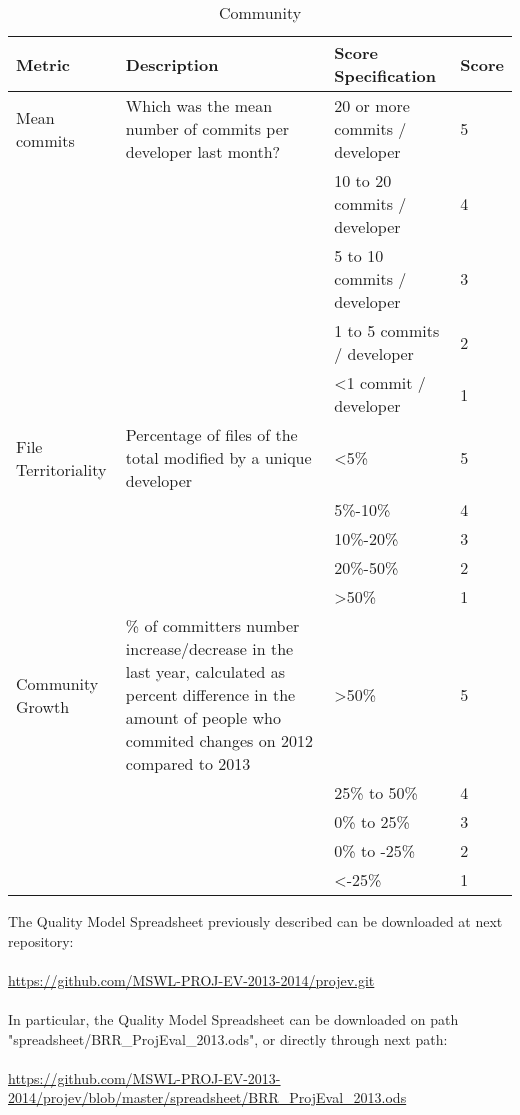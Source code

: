 \documentclass[11pt]{article}
\begin{document}
\begin{table}[H]
  \begin{center}
    \begin{tabular}{ | p{3cm} | p{5cm} | p{3cm} | l | }
    \hline
    Metric & Description & Score Specification & Score \\
    \hline
    Mean commits & Which was the mean number of commits per developer last month? & 20 or more commits / developer & 5 \\ \cline{3-3} \cline{4-4}
    & & 10 to 20 commits / developer & 4 \\ \cline{3-3}\cline{4-4}
    & & 5 to 10 commits / developer & 3 \\ \cline{3-3}\cline{4-4}
    & & 1 to 5 commits / developer & 2 \\ \cline{3-3}\cline{4-4}
    & & \textless 1 commit / developer & 1 \\ 
    \hline
    File Territoriality & Percentage of files of the total modified by a unique developer & \textless 5\% & 5 \\ \cline{3-3} \cline{4-4}
    & & 5\%-10\%  & 4 \\ \cline{3-3}\cline{4-4}
    & & 10\%-20\% & 3 \\ \cline{3-3}\cline{4-4}
    & & 20\%-50\% & 2 \\ \cline{3-3}\cline{4-4}
    & & \textgreater 50\% & 1 \\ 
    \hline
    Community Growth & \% of committers number increase/decrease in the last year, calculated as percent difference in the amount of people who commited changes on 2012 compared to 2013 & \textgreater50\% & 5 \\ \cline{3-3} \cline{4-4}
    & & 25\% to 50\% & 4 \\ \cline{3-3}\cline{4-4}
    & & 0\% to 25\%  & 3 \\ \cline{3-3}\cline{4-4}
    & & 0\% to -25\% & 2 \\ \cline{3-3}\cline{4-4}
    & & \textless-25\%       & 1 \\ 
    \hline
    \end{tabular}
    \caption{Community}
    \label{tab:community}
  \end{center}
\end{table}
The Quality Model Spreadsheet previously described can be downloaded at next repository:\\
\\
\url{https://github.com/MSWL-PROJ-EV-2013-2014/projev.git}\\
\\
In particular, the Quality Model Spreadsheet can be downloaded on path "spreadsheet/BRR\_ProjEval\_2013.ods", or directly through next path:\\
\\
\url{https://github.com/MSWL-PROJ-EV-2013-2014/projev/blob/master/spreadsheet/BRR_ProjEval_2013.ods}
\end{document}
